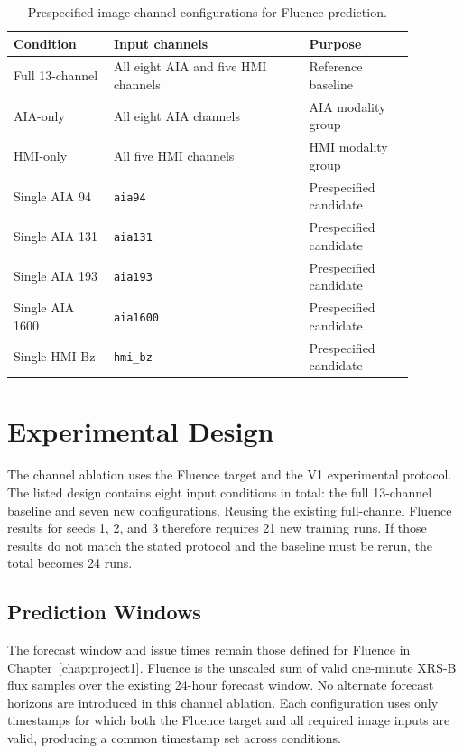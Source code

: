 \documentclass[12pt]{report}
\begin{document}
\begin{table}[htbp]
    \centering
    \small
    \caption{Prespecified image-channel configurations for Fluence prediction.}
    \label{tab:project2-input-configurations}
    \begin{tabular}{p{0.22\linewidth}p{0.43\linewidth}p{0.23\linewidth}}
        \toprule
        Condition & Input channels & Purpose \\
        \midrule
        Full 13-channel & All eight AIA and five HMI channels & Reference baseline \\
        AIA-only & All eight AIA channels & AIA modality group \\
        HMI-only & All five HMI channels & HMI modality group \\
        Single AIA 94 & \texttt{aia94} & Prespecified candidate \\
        Single AIA 131 & \texttt{aia131} & Prespecified candidate \\
        Single AIA 193 & \texttt{aia193} & Prespecified candidate \\
        Single AIA 1600 & \texttt{aia1600} & Prespecified candidate \\
        Single HMI Bz & \texttt{hmi\_bz} & Prespecified candidate \\
        \bottomrule
    \end{tabular}
\end{table}

\section{Experimental Design}

The channel ablation uses the Fluence target and the V1 experimental protocol. The listed design contains eight input conditions in total: the full 13-channel baseline and seven new configurations. Reusing the existing full-channel Fluence results for seeds 1, 2, and 3 therefore requires 21 new training runs. If those results do not match the stated protocol and the baseline must be rerun, the total becomes 24 runs.

\subsection{Prediction Windows}

The forecast window and issue times remain those defined for Fluence in Chapter~\ref{chap:project1}. Fluence is the unscaled sum of valid one-minute XRS-B flux samples over the existing 24-hour forecast window. No alternate forecast horizons are introduced in this channel ablation. Each configuration uses only timestamps for which both the Fluence target and all required image inputs are valid, producing a common timestamp set across conditions.
\end{document}

